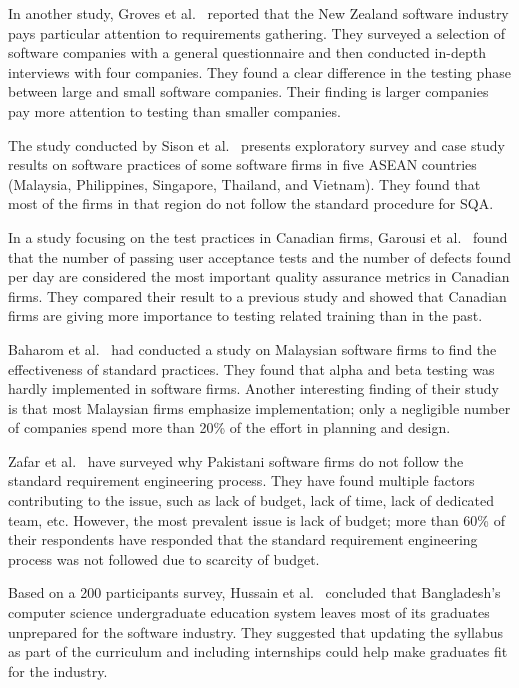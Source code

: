 In another study, Groves et al.~\citep{Groves2000} reported that the New Zealand software industry pays particular attention to requirements gathering. They surveyed a selection of software companies with a general questionnaire and then conducted in-depth interviews with four companies. They found a clear difference in the testing phase between large and small software companies. Their finding is larger companies pay more attention to testing than smaller companies.

The study conducted by Sison et al.~\citep{Sison2006} presents exploratory survey and case study results on software practices of some software firms in five ASEAN countries (Malaysia, Philippines, Singapore, Thailand, and Vietnam). They found that most of the firms in that region do not follow the standard procedure for SQA.

In a study focusing on the test practices in Canadian firms, Garousi et al.~\citep{Garousi2013} found that the number of passing user acceptance tests and the number of defects found per day are considered the most important quality assurance metrics in Canadian firms. They compared their result to a previous study and showed that Canadian firms are giving more importance to testing related training than in the past.

Baharom et al.~\citep{Baharom2006} had conducted a study on Malaysian software firms to find the effectiveness of standard practices. They found that alpha and beta testing was hardly implemented in software firms. Another interesting finding of their study is that most Malaysian firms emphasize implementation; only a negligible number of companies spend more than 20\% of the effort in planning and design.

Zafar et al.~\citep{Zafar2018} have surveyed why Pakistani software firms do not follow the standard requirement engineering process. They have found multiple factors contributing to the issue, such as lack of budget, lack of time, lack of dedicated team, etc. However, the most prevalent issue is lack of budget; more than 60\% of their respondents have responded that the standard requirement engineering process was not followed due to scarcity of budget.

Based on a 200 participants survey, Hussain et al.~\citep{Hussain2020} concluded that Bangladesh's computer science undergraduate education system leaves most of its graduates unprepared for the software industry. They suggested that updating the syllabus as part of the curriculum and including internships could help make graduates fit for the industry.


